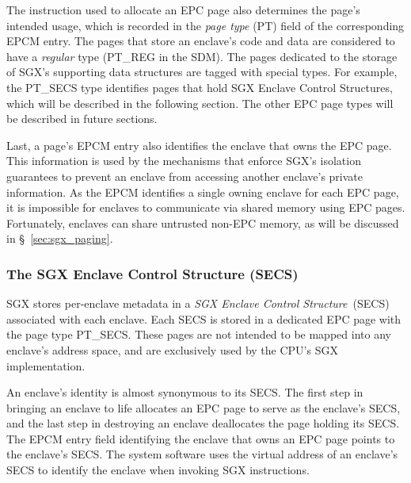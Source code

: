 The instruction used to allocate an EPC page also determines the page's
intended usage, which is recorded in the \textit{page type} (PT) field of the
corresponding EPCM entry. The pages that store an enclave's code and data are
considered to have a \textit{regular} type (PT\_REG in the SDM). The pages
dedicated to the storage of SGX's supporting data structures are tagged with
special types. For example, the PT\_SECS type identifies pages that hold SGX
Enclave Control Structures, which will be described in the following section.
The other EPC page types will be described in future sections.

Last, a page's EPCM entry also identifies the enclave that owns the EPC page.
This information is used by the mechanisms that enforce SGX's isolation
guarantees to prevent an enclave from accessing another enclave's private
information. As the EPCM identifies a single owning enclave for each EPC page,
it is impossible for enclaves to communicate via shared memory using EPC pages.
Fortunately, enclaves can share untrusted non-EPC memory, as will be discussed
in \S~\ref{sec:sgx_paging}.


\subsubsection{The SGX Enclave Control Structure (SECS)}
\label{sec:sgx_secs}


SGX stores per-enclave metadata in a
\textit{SGX Enclave Control Structure}~(SECS) associated with each enclave.
Each SECS is stored in a dedicated EPC page with the page type PT\_SECS. These
pages are not intended to be mapped into any enclave's address space, and are
exclusively used by the CPU's SGX implementation.


An enclave's identity is almost synonymous to its SECS. The first step in
bringing an enclave to life allocates an EPC page to serve as the enclave's
SECS, and the last step in destroying an enclave deallocates the page holding
its SECS. The EPCM entry field identifying the enclave that owns an EPC page
points to the enclave's SECS. The system software uses the virtual address of
an enclave's SECS to identify the enclave when invoking SGX instructions.


